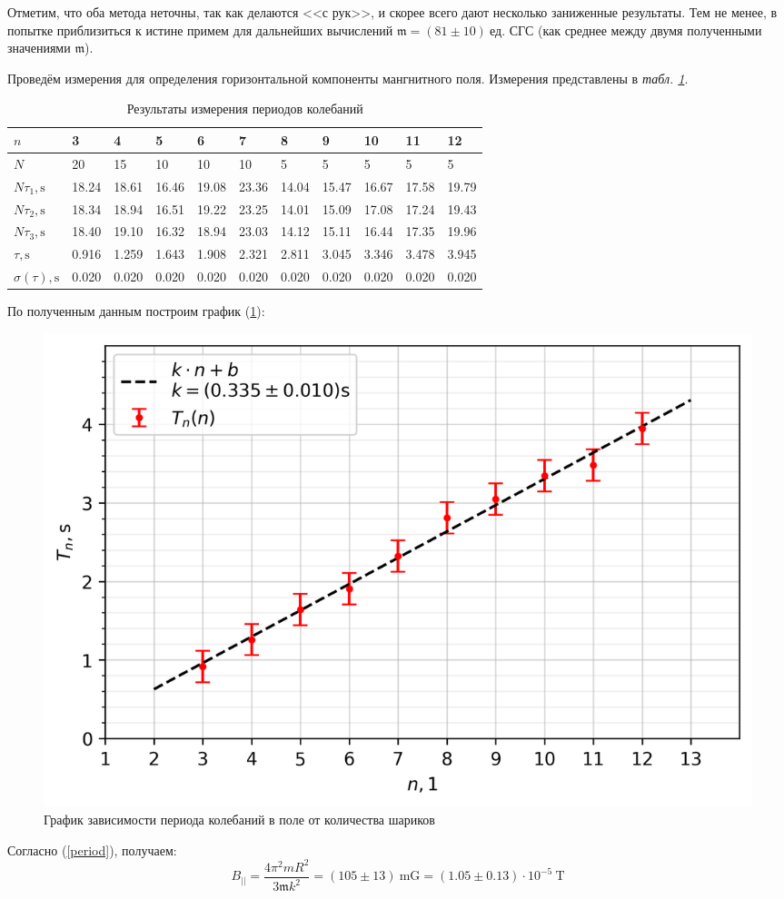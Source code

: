 \documentclass[12pt, a4paper]{article}
\newcommand{\m}{\mathfrak{m}}
\newcommand{\fcgs}{~\text{ед. СГС}}
\begin{document}
Отметим, что оба метода неточны, так как делаются <<с рук>>, и скорее всего дают несколько заниженные результаты. Тем не менее, в попытке приблизиться к истине примем для дальнейших вычислений $\m = (81\pm 10)\fcgs$ (как среднее между двумя полученными значениями $\m$).

Проведём измерения для определения горизонтальной компоненты мангнитного поля. Измерения представлены в \textit{табл. \ref{results1}}.

\begin{table}[H]
\centering
\begin{tabular}{|l|l|l|l|l|l|l|l|l|l|l|}
\hline
$n$                      & 3     & 4     & 5     & 6     & 7     & 8     & 9     & 10    & 11    & 12    \\ \hline
$N$                      & 20    & 15    & 10    & 10    & 10    & 5     & 5     & 5     & 5     & 5     \\ \hline
$N\tau_1, \mathrm{s}$    & 18.24 & 18.61 & 16.46 & 19.08 & 23.36 & 14.04 & 15.47 & 16.67 & 17.58 & 19.79 \\ \hline
$N\tau_2, \mathrm{s}$    & 18.34 & 18.94 & 16.51 & 19.22 & 23.25 & 14.01 & 15.09 & 17.08 & 17.24 & 19.43 \\ \hline
$N\tau_3, \mathrm{s}$    & 18.40 & 19.10 & 16.32 & 18.94 & 23.03 & 14.12 & 15.11 & 16.44 & 17.35 & 19.96 \\ \hline
$\tau, \mathrm{s}$ & 0.916 & 1.259 & 1.643 & 1.908 & 2.321 & 2.811 & 3.045 & 3.346 & 3.478 & 3.945 \\ \hline
$\sigma({\tau}), \mathrm{s}$         & 0.020 & 0.020 & 0.020 & 0.020 & 0.020 & 0.020 & 0.020 & 0.020 & 0.020 & 0.020 \\ \hline
\end{tabular}
\caption{Результаты измерения периодов колебаний}
\label{results1}
\end{table}
По полученным данным построим график (\ref{plot_tn_n}):
\begin{figure}[H]
\centering
\includegraphics[width=0.8\linewidth]{pics/plot_tn_n.png}
\caption{График зависимости периода колебаний в поле от количества шариков}
\label{plot_tn_n}
\end{figure}
Согласно (\ref{period}), получаем:
\begin{equation}
B_{||} = \dfrac{4\pi^2 mR^2}{3\m k^2} = (105\pm 13)~\mathrm{mG} = (1.05\pm 0.13)\cdot 10^{-5}~\mathrm{T}
\end{equation}
\end{document}
